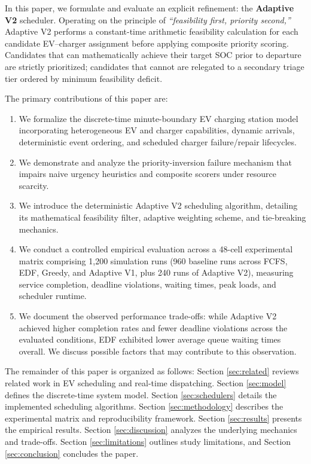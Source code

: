 \documentclass[conference]{IEEEtran}
\begin{document}
In this paper, we formulate and evaluate an explicit refinement: the \textbf{Adaptive V2} scheduler. Operating on the principle of \emph{``feasibility first, priority second,''} Adaptive V2 performs a constant-time arithmetic feasibility calculation for each candidate EV–charger assignment before applying composite priority scoring. Candidates that can mathematically achieve their target SOC prior to departure are strictly prioritized; candidates that cannot are relegated to a secondary triage tier ordered by minimum feasibility deficit.

The primary contributions of this paper are:
\begin{enumerate}
    \item We formalize the discrete-time minute-boundary EV charging station model incorporating heterogeneous EV and charger capabilities, dynamic arrivals, deterministic event ordering, and scheduled charger failure/repair lifecycles.
    \item We demonstrate and analyze the priority-inversion failure mechanism that impairs naive urgency heuristics and composite scorers under resource scarcity.
    \item We introduce the deterministic Adaptive V2 scheduling algorithm, detailing its mathematical feasibility filter, adaptive weighting scheme, and tie-breaking mechanics.
    \item We conduct a controlled empirical evaluation across a 48-cell experimental matrix comprising 1,200 simulation runs (960 baseline runs across FCFS, EDF, Greedy, and Adaptive V1, plus 240 runs of Adaptive V2), measuring service completion, deadline violations, waiting times, peak loads, and scheduler runtime.
    \item We document the observed performance trade-offs: while Adaptive V2 achieved higher completion rates and fewer deadline violations across the evaluated conditions, EDF exhibited lower average queue waiting times overall. We discuss possible factors that may contribute to this observation.
\end{enumerate}

The remainder of this paper is organized as follows: Section \ref{sec:related} reviews related work in EV scheduling and real-time dispatching. Section \ref{sec:model} defines the discrete-time system model. Section \ref{sec:schedulers} details the implemented scheduling algorithms. Section \ref{sec:methodology} describes the experimental matrix and reproducibility framework. Section \ref{sec:results} presents the empirical results. Section \ref{sec:discussion} analyzes the underlying mechanics and trade-offs. Section \ref{sec:limitations} outlines study limitations, and Section \ref{sec:conclusion} concludes the paper.
\end{document}
